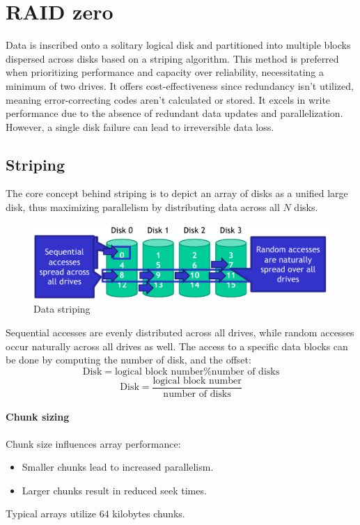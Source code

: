 \section{RAID zero}

Data is inscribed onto a solitary logical disk and partitioned into multiple blocks dispersed across disks based on a striping algorithm. 
This method is preferred when prioritizing performance and capacity over reliability, necessitating a minimum of two drives. 
It offers cost-effectiveness since redundancy isn't utilized, meaning error-correcting codes aren't calculated or stored. 
It excels in write performance due to the absence of redundant data updates and parallelization.
However, a single disk failure can lead to irreversible data loss.

\subsection{Striping}
The core concept behind striping is to depict an array of disks as a unified large disk, thus maximizing parallelism by distributing data across all $N$ disks.
\begin{figure}[H]
    \centering
    \includegraphics[width=1\linewidth]{images/strip.png}
    \caption{Data striping}
\end{figure}
Sequential accesses are evenly distributed across all drives, while random accesses occur naturally across all drives as well.
The access to a specific data blocks can be done by computing the number of disk, and the offset: 
\[\text{Disk}=\text{logical block number} \% \text{number of disks}\]
\[\text{Disk}=\dfrac{\text{logical block number}}{\text{number of disks}}\]

\paragraph*{Chunk sizing}
Chunk size influences array performance:
\begin{itemize}
    \item Smaller chunks lead to increased parallelism.
    \item Larger chunks result in reduced seek times.
\end{itemize}
Typical arrays utilize 64 kilobytes chunks.

